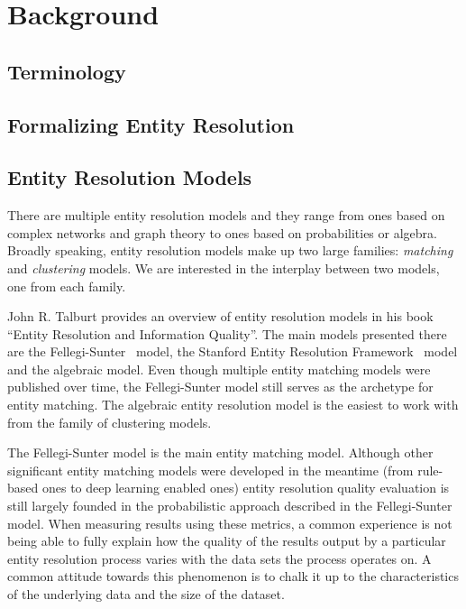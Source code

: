 \documentclass[journal]{IEEEtran}
\begin{document}
    \section{Background}\label{sec:Theoretical Background}
    \subsection{Terminology}\label{sec:Terminology}
    
    
    \subsection{Formalizing Entity Resolution}\label{sec:Entity Resolution Formalization}
    

    \subsection{Entity Resolution Models}\label{subsec:Entity Resolution Models}

    There are multiple entity resolution models and they range from ones based
    on complex networks and graph theory\cite{Li2020} to ones based on
    probabilities\cite{fs1969} or algebra\cite{Tal11,Ben2009Swoosh}.
    Broadly speaking, entity resolution models make up two large families:
    \textit{matching} and \textit{clustering} models.
    We are interested in the interplay between two models, one from each family.

    John R. Talburt provides an overview of entity resolution models in his book
    ``Entity Resolution and Information Quality''\cite{Tal11}.
    The main models presented there are the Fellegi-Sunter~\cite{fs1969} model,
    the Stanford Entity Resolution Framework~\cite{Ben2009Swoosh} model and the
    algebraic\cite{tal2007algebraic} model.
    Even though multiple entity matching models were published over time, the
    Fellegi-Sunter model still serves as the archetype for entity matching.
    The algebraic entity resolution model is the easiest to work with from the
    family of clustering models.

    The Fellegi-Sunter model is the main entity matching model.
    Although other significant entity matching models were developed in the
    meantime (from rule-based ones to deep learning enabled ones) entity
    resolution quality evaluation is still largely founded in the probabilistic
    approach described in the Fellegi-Sunter model.
    When measuring results using these metrics, a common experience is not being
    able to fully explain how the quality of the results output by a particular
    entity resolution process varies with the data sets the process operates on.
    A common attitude towards this phenomenon is to chalk it up to the
    characteristics of the underlying data and the size of the dataset.
    
\end{document}
